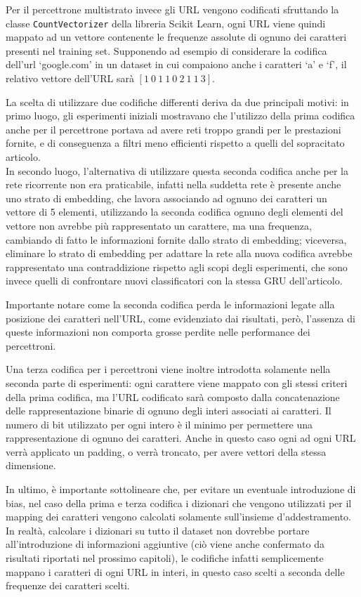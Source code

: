 \documentclass[../../main.tex]{subfiles}
\begin{document}
    Per il percettrone multistrato invece gli URL vengono codificati sfruttando la classe \texttt{CountVectorizer} della libreria Scikit Learn, ogni URL viene quindi mappato ad un vettore contenente le frequenze assolute di ognuno dei caratteri presenti nel training set. Supponendo ad esempio di considerare la codifica dell'url `google.com' in un dataset in cui compaiono anche i caratteri `a' e `f', il relativo vettore dell'URL sarà $[1 \ 0 \ 1 \ 1 \ 0 \ 2 \ 1 \ 1 \ 3]$.

    La scelta di utilizzare due codifiche differenti deriva da due principali motivi: in primo luogo, gli esperimenti iniziali mostravano che l'utilizzo della prima codifica anche per il percettrone portava ad avere reti troppo grandi per le prestazioni fornite, e di conseguenza a filtri meno efficienti rispetto a quelli del sopracitato articolo.\\
    In secondo luogo, l'alternativa di utilizzare questa seconda codifica anche per la rete ricorrente non era praticabile, infatti nella suddetta rete è presente anche uno strato di embedding, che lavora associando ad ognuno dei caratteri un vettore di 5 elementi, utilizzando la seconda codifica ognuno degli elementi del vettore non avrebbe più rappresentato un carattere, ma una frequenza, cambiando di fatto le informazioni fornite dallo strato di embedding; viceversa, eliminare lo strato di embedding per adattare la rete alla nuova codifica avrebbe rappresentato una contraddizione rispetto agli scopi degli esperimenti, che sono invece quelli di confrontare nuovi classificatori con la stessa GRU dell'articolo.

    Importante notare come la seconda codifica perda le informazioni legate alla posizione dei caratteri nell'URL, come evidenziato dai risultati, però, l'assenza di queste informazioni non comporta grosse perdite nelle performance dei percettroni.

    Una terza codifica per i percettroni viene inoltre introdotta solamente nella seconda parte di esperimenti: ogni carattere viene mappato con gli stessi criteri della prima codifica, ma l'URL codificato sarà composto dalla concatenazione delle rappresentazione binarie di ognuno degli interi associati ai caratteri. Il numero di bit utilizzato per ogni intero è il minimo per permettere una rappresentazione di ognuno dei caratteri. Anche in questo caso ogni ad ogni URL verrà applicato un padding, o verrà troncato, per avere vettori della stessa dimensione.

    In ultimo, è importante sottolineare che, per evitare un eventuale introduzione di bias, nel caso della prima e terza codifica i dizionari che vengono utilizzati per il mapping dei caratteri vengono calcolati solamente sull'insieme d'addestramento. In realtà, calcolare i dizionari su tutto il dataset non dovrebbe portare all'introduzione di informazioni aggiuntive (ciò viene anche confermato da risultati riportati nel prossimo capitoli), le codifiche infatti semplicemente mappano i caratteri di ogni URL in interi, in questo caso scelti a seconda delle frequenze dei caratteri scelti.
\end{document}
